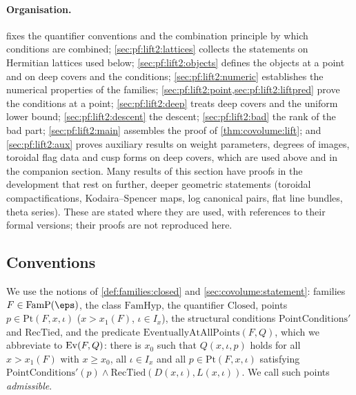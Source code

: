 \paragraph{Organisation.}  fixes the quantifier conventions and the combination
principle by which conditions are combined; \cref{sec:pf:lift2:lattices} collects the statements on
Hermitian lattices used below; \cref{sec:pf:lift2:objects} defines the objects at a point and on deep covers
and the conditions; \cref{sec:pf:lift2:numeric} establishes the numerical properties of the
families; \cref{sec:pf:lift2:point,sec:pf:lift2:liftpred} prove the conditions at a point;
\cref{sec:pf:lift2:deep} treats deep covers and the uniform lower bound; \cref{sec:pf:lift2:descent} the
descent; \cref{sec:pf:lift2:bad} the rank of the bad part; \cref{sec:pf:lift2:main} assembles the proof
of \cref{thm:covolume:lift}; and \cref{sec:pf:lift2:aux} proves auxiliary results on weight parameters, degrees of images,
toroidal flag data and cusp forms on deep covers, which are used above and in the companion section. Many results of this section have proofs in the development that rest on
further, deeper geometric statements (toroidal compactifications, Kodaira--Spencer maps, log canonical pairs,
flat line bundles, theta series). These are stated where they are used, with references to their formal
versions; their proofs are not reproduced here.

\subsection{Conventions}\label{sec:pf:lift2:conv}

We use the notions of \cref{def:families:closed} and \cref{sec:covolume:statement}: families
$F\in\mathrm{FamP}(\eps)$, the class $\mathrm{FamHyp}$, the quantifier $\mathrm{Closed}$, points
$p\in\mathrm{Pt}(F,x,\iota)$ ($x>x_1(F)$, $\iota\in I_x$), the structural conditions $\mathrm{PointConditions}'$
and $\mathrm{RecTied}$, and the predicate $\mathrm{EventuallyAtAllPoints}(F,Q)$, which we abbreviate to
$\operatorname{Ev}(F,Q)$: there is $x_0$ such that $Q(x,\iota,p)$ holds for all $x>x_1(F)$ with $x\ge x_0$, all
$\iota\in I_x$ and all $p\in\mathrm{Pt}(F,x,\iota)$ satisfying
$\mathrm{PointConditions}'(p)\wedge\mathrm{RecTied}(D(x,\iota),L(x,\iota))$. We call such points
\emph{admissible}.


